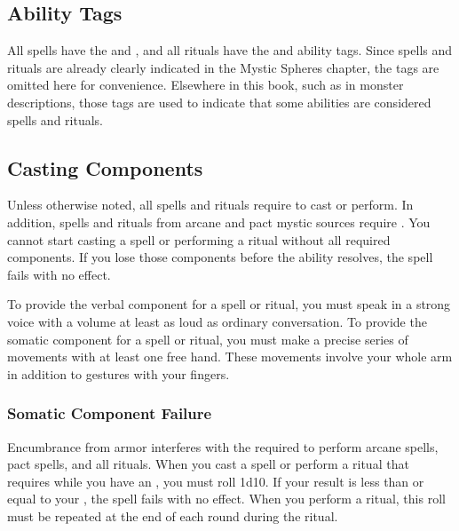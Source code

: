     \subsection{Ability Tags}
        All spells have the  and  , and all rituals have the  and  ability tags.
        Since spells and rituals are already clearly indicated in the Mystic Spheres chapter, the tags are omitted here for convenience.
        Elsewhere in this book, such as in monster descriptions, those tags are used to indicate that some abilities are considered spells and rituals.

    \subsection{Casting Components}\label{Casting Components}
        Unless otherwise noted, all spells and rituals require  to cast or perform.
        In addition, spells and rituals from arcane and pact mystic sources require .
        You cannot start casting a spell or performing a ritual without all required components.
        If you lose those components before the ability resolves, the spell fails with no effect.

        To provide the verbal component for a spell or ritual, you must speak in a strong voice with a volume at least as loud as ordinary conversation.
        To provide the somatic component for a spell or ritual, you must make a precise series of movements with at least one free hand.
        These movements involve your whole arm in addition to gestures with your fingers.

        \subsubsection{Somatic Component Failure}\label{Somatic Component Failure}
            Encumbrance from armor interferes with the  required to perform arcane spells, pact spells, and all rituals.
            When you cast a spell or perform a ritual that requires  while you have an , you must roll 1d10.
            If your result is less than or equal to your , the spell fails with no effect.
            When you perform a ritual, this roll must be repeated at the end of each round during the ritual.


